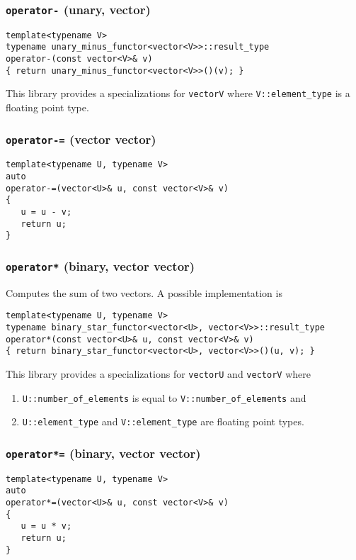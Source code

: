 \documentclass[oneside]{book}
\begin{document}
\subsubsection{\texttt{operator-} (unary, vector)}
\begin{verbatim}
template<typename V>
typename unary_minus_functor<vector<V>>::result_type
operator-(const vector<V>& v)
{ return unary_minus_functor<vector<V>>()(v); }
\end{verbatim}
This library provides a specializations for \texttt{vector\textlangle V\textrangle}
where \texttt{V::element\_type} is a floating point type.

\subsubsection{\texttt{operator-=} (vector vector)}
\begin{verbatim}
template<typename U, typename V>
auto
operator-=(vector<U>& u, const vector<V>& v)
{
   u = u - v;
   return u;
}
\end{verbatim}
\subsubsection{\texttt{operator*} (binary, vector vector)}
Computes the sum of two vectors.
A possible implementation is
\begin{verbatim}
template<typename U, typename V>
typename binary_star_functor<vector<U>, vector<V>>::result_type
operator*(const vector<U>& u, const vector<V>& v)
{ return binary_star_functor<vector<U>, vector<V>>()(u, v); }
\end{verbatim}
This library provides a specializations for \texttt{vector\textlangle U\textrangle}
and \texttt{vector\textlangle V\textrangle} where
\begin{enumerate}
	\item \texttt{U::number\_of\_elements} is equal to \texttt{V::number\_of\_elements} and
	\item \texttt{U::element\_type} and \texttt{V::element\_type} are floating point types.
\end{enumerate}

\subsubsection{\texttt{operator*=} (binary, vector vector)}
\begin{verbatim}
template<typename U, typename V>
auto
operator*=(vector<U>& u, const vector<V>& v)
{
   u = u * v;
   return u;
}
\end{verbatim}
\end{document}
